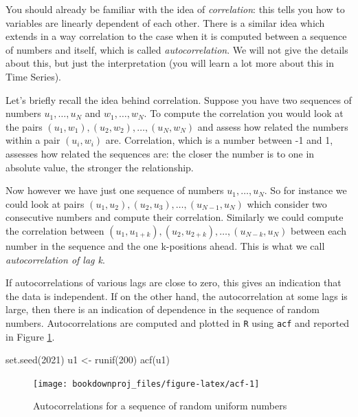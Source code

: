 \documentclass[
]{book}
\newenvironment{Shaded}{\begin{snugshade}}{\end{snugshade}}
\newcommand{\DecValTok}[1]{\textcolor[rgb]{0.00,0.00,0.81}{#1}}
\newcommand{\FunctionTok}[1]{\textcolor[rgb]{0.00,0.00,0.00}{#1}}
\newcommand{\NormalTok}[1]{#1}
\newcommand{\OtherTok}[1]{\textcolor[rgb]{0.56,0.35,0.01}{#1}}
\theoremstyle{definition}
\theoremstyle{definition}
\theoremstyle{definition}
\theoremstyle{definition}
\theoremstyle{remark}
\begin{document}
You should already be familiar with the idea of \emph{correlation}: this tells you how to variables are linearly dependent of each other. There is a similar idea which extends in a way correlation to the case when it is computed between a sequence of numbers and itself, which is called \emph{autocorrelation}. We will not give the details about this, but just the interpretation (you will learn a lot more about this in Time Series).

Let's briefly recall the idea behind correlation. Suppose you have two sequences of numbers \(u_1,\dots,u_N\) and \(w_1,\dots,w_N\). To compute the correlation you would look at the pairs \((u_1,w_1),(u_2,w_2),\dots, (u_N,w_N)\) and assess how related the numbers within a pair \((u_i,w_i)\) are. Correlation, which is a number between -1 and 1, assesses how related the sequences are: the closer the number is to one in absolute value, the stronger the relationship.

Now however we have just one sequence of numbers \(u_1,\dots,u_N\). So for instance we could look at pairs \((u_1,u_2), (u_2,u_3), \dots, (u_{N-1},u_{N})\) which consider two consecutive numbers and compute their correlation. Similarly we could compute the correlation between \((u_1,u_{1+k}), (u_2,u_{2+k}),\dots, (u_{N-k},u_N)\) between each number in the sequence and the one k-positions ahead. This is what we call \emph{autocorrelation of lag k}.

If autocorrelations of various lags are close to zero, this gives an indication that the data is independent. If on the other hand, the autocorrelation at some lags is large, then there is an indication of dependence in the sequence of random numbers. Autocorrelations are computed and plotted in \texttt{R} using \texttt{acf} and reported in Figure \ref{fig:acf}.

\begin{Shaded}
\begin{Highlighting}[]
\FunctionTok{set.seed}\NormalTok{(}\DecValTok{2021}\NormalTok{)}
\NormalTok{u1 }\OtherTok{\textless{}{-}} \FunctionTok{runif}\NormalTok{(}\DecValTok{200}\NormalTok{)}
\FunctionTok{acf}\NormalTok{(u1)}
\end{Highlighting}
\end{Shaded}

\begin{figure}

{\centering \texttt{[image: bookdownproj\_files/figure-latex/acf-1]} 

}

\caption{Autocorrelations for a sequence of random uniform numbers}\label{fig:acf}
\end{figure}
\end{document}
